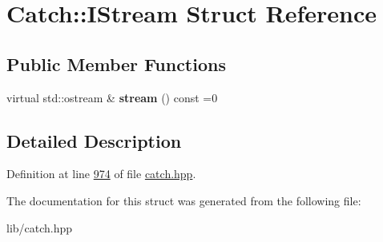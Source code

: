 \hypertarget{structCatch_1_1IStream}{}\section{Catch\+::I\+Stream Struct Reference}
\label{structCatch_1_1IStream}
\subsection*{Public Member Functions}
\begin{DoxyCompactItemize}
\item 
\mbox{\label{structCatch_1_1IStream_a55a9ddbe250261ff38642f480ebdd902}} 
virtual std\+::ostream \& {\bfseries stream} () const =0
\end{DoxyCompactItemize}


\subsection{Detailed Description}


Definition at line \mbox{\hyperlink{catch_8hpp_source_l00974}{974}} of file \mbox{\hyperlink{catch_8hpp_source}{catch.\+hpp}}.



The documentation for this struct was generated from the following file\+:\begin{DoxyCompactItemize}
\item 
lib/catch.\+hpp\end{DoxyCompactItemize}
